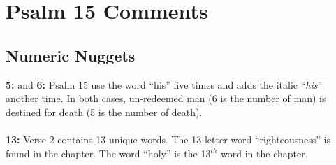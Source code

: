 \section{Psalm 15 Comments}

\subsection{Numeric Nuggets}
\textbf{5:} and \textbf{6:} Psalm 15 use the word ``his'' five times and adds the italic ``\emph{his}'' another time. In both cases, un-redeemed man (6 is the number of man) is destined for death (5 is the number of death).\\
\\
\textbf{13:} Verse 2 contains 13 unique words. The 13-letter word ``righteousness'' is found in the chapter. The word ``holy'' is the 13$^{th}$ word in the chapter.

